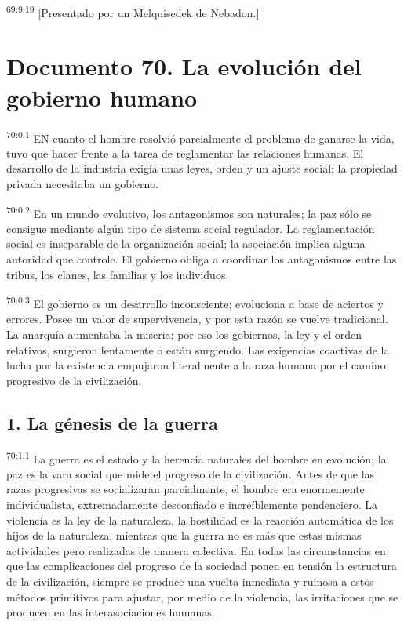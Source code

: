 \documentclass[twoside, 11pt]{book}
\begin{document}
\par
\textsuperscript{69:9.19} [Presentado por un Melquisedek de Nebadon.]


\chapter{Documento 70. La evolución del gobierno humano}
\par
\textsuperscript{70:0.1} EN cuanto el hombre resolvió parcialmente el problema de ganarse la vida, tuvo que hacer frente a la tarea de reglamentar las relaciones humanas. El desarrollo de la industria exigía unas leyes, orden y un ajuste social; la propiedad privada necesitaba un gobierno.

\par
\textsuperscript{70:0.2} En un mundo evolutivo, los antagonismos son naturales; la paz sólo se consigue mediante algún tipo de sistema social regulador. La reglamentación social es inseparable de la organización social; la asociación implica alguna autoridad que controle. El gobierno obliga a coordinar los antagonismos entre las tribus, los clanes, las familias y los individuos.

\par
\textsuperscript{70:0.3} El gobierno es un desarrollo inconsciente; evoluciona a base de aciertos y errores. Posee un valor de supervivencia, y por esta razón se vuelve tradicional. La anarquía aumentaba la miseria; por eso los gobiernos, la ley y el orden relativos, surgieron lentamente o están surgiendo. Las exigencias coactivas de la lucha por la existencia empujaron literalmente a la raza humana por el camino progresivo de la civilización.

\section*{1. La génesis de la guerra}
\par
\textsuperscript{70:1.1} La guerra es el estado y la herencia naturales del hombre en evolución; la paz es la vara social que mide el progreso de la civilización. Antes de que las razas progresivas se socializaran parcialmente, el hombre era enormemente individualista, extremadamente desconfiado e increíblemente pendenciero. La violencia es la ley de la naturaleza, la hostilidad es la reacción automática de los hijos de la naturaleza, mientras que la guerra no es más que estas mismas actividades pero realizadas de manera colectiva. En todas las circunstancias en que las complicaciones del progreso de la sociedad ponen en tensión la estructura de la civilización, siempre se produce una vuelta inmediata y ruinosa a estos métodos primitivos para ajustar, por medio de la violencia, las irritaciones que se producen en las interasociaciones humanas.
\end{document}
